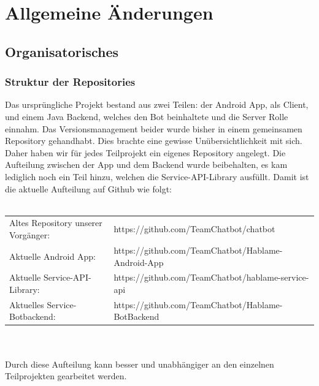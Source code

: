 \section{Allgemeine Änderungen}

\subsection{Organisatorisches}
\subsubsection{Struktur der Repositories}
Das ursprüngliche Projekt bestand aus zwei Teilen: der Android App, als
Client, und einem Java Backend, welches den Bot beinhaltete und die Server
Rolle einnahm. Das Versionsmanagement beider wurde bisher in einem gemeinsamen
Repository gehandhabt. Dies brachte eine gewisse Unübersichtlichkeit
mit sich. Daher haben wir für jedes Teilprojekt ein eigenes Repository angelegt.
Die Aufteilung zwischen der App und dem Backend wurde beibehalten, es kam
lediglich noch ein Teil hinzu, welchen die Service-API-Library ausfüllt. Damit
ist die aktuelle Aufteilung auf Github wie folgt:\\\\
\begin{small}
\begin{tabular}{ l l }
Altes Repository unserer Vorgänger: & https://github.com/TeamChatbot/chatbot\\
Aktuelle Android App: & https://github.com/TeamChatbot/Hablame-Android-App\\
Aktuelle Service-API-Library: &
https://github.com/TeamChatbot/hablame-service-api\\
Aktuelles Service-Botbackend: &
https://github.com/TeamChatbot/Hablame-BotBackend\\
\end{tabular}
\end{small}\\\\
Durch diese Aufteilung kann besser und unabhängiger an den einzelnen Teilprojekten gearbeitet werden.

